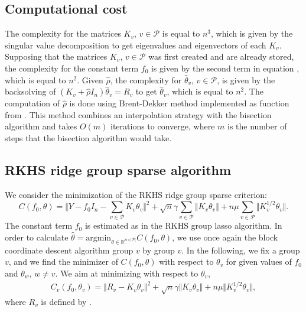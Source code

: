 \subsection{Computational cost}
The complexity for the matrices $K_v$, $v\in\mathcal{P}$ is equal to $n^3$, which is given by the singular value decomposition to get eigenvalues and eigenvectors of each $K_v$.
Supposing that the matrices $K_v$, $v\in\mathcal{P}$ was first created and are already stored, the complexity for the constant term $f_0$ is given by the second term in equation , which is equal to $n^2$. Given $\widehat{\rho}$, the complexity for $\widehat{\theta}_v$, $v\in\mathcal{P}$, is given by the backsolving of $(K_v+\widehat{\rho} I_n)\widehat{\theta}_v=R_v$ to get $\widehat{\theta}_v$, which is equal to $n^2$.  The computation of $\widehat{\rho}$ is done using Brent-Dekker method implemented as function  from \citet{galassi2018scientific}. This method combines an interpolation strategy with the bisection algorithm and takes $O(m)$ iterations to converge, where $m$ is the number of steps that the bisection algorithm would take.   
\subsection{RKHS ridge group sparse algorithm}
We consider the minimization of the RKHS ridge group sparse criterion:
$$C(f_0,\theta)=\Vert Y-f_0I_n-\sum_{v\in\mathcal{P}}K_v\theta_v\Vert^2+\sqrt{n}\gamma\sum_{v\in\mathcal{P}}\Vert K_v\theta_v\Vert+n\mu\sum_{v\in\mathcal{P}}\Vert K_v^{1/2}\theta_v\Vert.$$
The constant term $f_0$ is estimated as in the RKHS group lasso algorithm. In order to calculate $\widehat{\theta}=\text{argmin}_{\theta\in\mathbb{R}^{n\times\vert\mathcal{P}\vert}}C(f_0,\theta)$, we use once again the block coordinate descent algorithm group $v$ by group $v$. In the following, we fix a group $v$, and we find the minimizer of $C(f_0,\theta)$ with respect to $\theta_v$ for given values of $f_0$ and $\theta_w$, $w\neq v$. We aim at minimizing with respect to $\theta_v$,
\begin{align*}
C_v(f_0,\theta_v)=\Vert R_v-K_v\theta_v\Vert^2+\sqrt{n}\gamma\Vert K_v\theta_v\Vert+n\mu\Vert K_v^{1/2}\theta_v\Vert,
\end{align*}
where $R_v$ is defined by .

